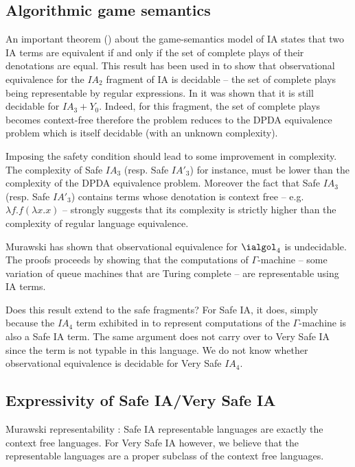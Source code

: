 \subsection{Algorithmic game semantics}

An important theorem (\cite{AM97a}) about the game-semantics model
of IA states that two IA terms are equivalent if and only if the set
of complete plays of their denotations are equal. This result has
been used in \cite{ghicamccusker00} to show that observational
equivalence for the $IA_2$ fragment of IA is decidable -- the set of
complete plays being representable by regular expressions. In
\cite{Ong02} it was shown that it is still decidable
 for $IA_3+Y_0$. Indeed, for this fragment, the set of complete plays becomes context-free
therefore the problem reduces to the DPDA equivalence problem which
is itself decidable (with an unknown complexity).

Imposing the safety condition should lead to some improvement in
complexity. The complexity of  Safe $IA_3$ (resp. Safe $IA'_3$) for
instance, must be lower than the complexity of the DPDA equivalence
problem. Moreover the fact that Safe $IA_3$ (resp. Safe $IA'_3$)
contains terms whose denotation is context free -- e.g. $\lambda f .
f (\lambda x .x )$ -- strongly suggests that its complexity is
strictly higher than the complexity of regular language equivalence.

Murawski \cite{Murawski2003} has shown that observational
equivalence for $\ialgol_4$ is undecidable. The proofs proceeds by
showing that the computations of $\Gamma$-machine -- some variation
of queue machines that are Turing complete -- are representable
using IA terms.

Does this result extend to the safe fragments? For Safe IA, it does,
simply because the $IA_4$ term exhibited in \cite{Murawski2003} to
represent computations of the $\Gamma$-machine is also a Safe IA
term. The same argument does not carry over to Very Safe IA since
the term is not typable in this language. We do not know whether
observational equivalence is decidable for Very Safe $IA_4$.



\subsection{Expressivity of Safe IA/Very Safe IA}

Murawski representability : Safe IA representable languages are
exactly the context free languages. For Very Safe IA however, we
believe that the representable languages are a proper subclass of
the context free languages.








